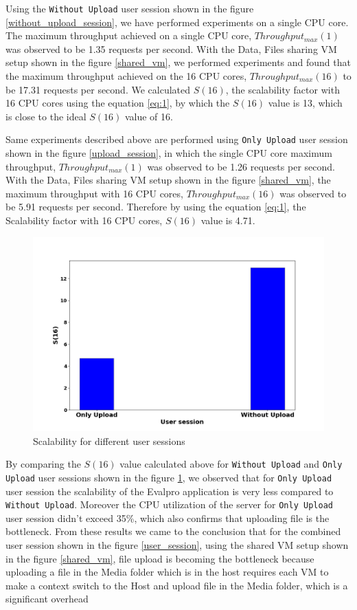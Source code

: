 \documentclass{iitbreport}
\begin{document}
Using the \texttt{Without Upload}  user session shown in the figure \ref{without_upload_session}, we have performed experiments on a single CPU core. The maximum throughput achieved on a single CPU core, $Throughput_{max}(1)$ was observed to be 1.35 requests per second. With the Data, Files sharing  VM  setup shown in the figure \ref{shared_vm}, we performed experiments and found that the maximum throughput achieved on the 16 CPU cores, $Throughput_{max}(16)$ to be 17.31 requests per second. We calculated $S(16)$, the scalability factor with 16 CPU cores using the equation \ref{eq:1}, by which  the $S(16)$ value is 13, which is close to the ideal $S(16)$ value of 16.

Same experiments described above are performed using \texttt{Only Upload} user session shown in the figure \ref{upload_session}, in which the single CPU core maximum throughput,  $Throughput_{max}(1)$ was observed to be 1.26 requests per second.  With the Data, Files sharing  VM  setup shown in the figure  \ref{shared_vm}, the  maximum throughput with 16 CPU cores, $Throughput_{max}(16)$  was observed to be 5.91 requests per second. Therefore by using the equation \ref{eq:1}, the Scalability factor with 16 CPU cores, $S(16)$ value is 4.71.


\begin{figure}[!htb]
  \centering
  \includegraphics[width=\linewidth]{Images/upload_vs_without_upload.png}
  \caption{Scalability for different user sessions}
  \label{compare_user_sessions}
\end{figure}

By comparing the $S(16)$  value calculated above for \texttt{Without Upload} and  \texttt{Only Upload} user sessions shown in the figure  \ref{compare_user_sessions}, we observed that for \texttt{Only Upload} user session the scalability  of the Evalpro application is very less compared to \texttt{Without Upload}. Moreover the CPU utilization of the server for  \texttt{Only Upload} user session  didn't exceed  35\%, which also confirms that uploading file is the bottleneck. From these results we came to the conclusion that for the combined user session shown in the figure \ref{user_session}, using the shared VM setup shown in the figure \ref{shared_vm}, file upload is becoming the bottleneck because uploading a file in the Media folder which is in the host requires each VM to make a context switch to the Host and upload file in the Media folder, which is a significant overhead
\end{document}
